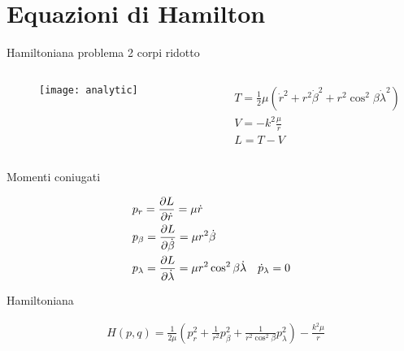 \section{Equazioni di Hamilton}

\begin{frame}{Hamiltoniana problema 2 corpi ridotto}

\begin{columns}

\begin{column}{0.2\textwidth}

\begin{figure}[!ht]

\texttt{[image: analytic]}

\end{figure}


\end{column}

\begin{column}{0.8\textwidth}

\begin{align*}
&T=\frac{1}{2}\mu(\dot{r}^2+r^2\dot{\beta}^2+r^2\cos^2{\beta}\dot{\lambda}^2)\\
&V=-k^2\frac{\mu}{r}\\
&L=T-V
\end{align*}

\end{column}

\end{columns}

\begin{block}{Momenti coniugati}

\begin{align*}
&p_r=\PDy{\dot{r}}{L}=\mu\dot{r}\\
&p_{\beta}=\PDy{\dot{\beta}}{L}=\mu r^2\dot{\beta}\\
&p_{\lambda}=\PDy{\dot{\lambda}}{L}=\mu r^2\cos^2{\beta}\dot{\lambda}\quad \dot{p}_{\lambda}=0
\end{align*}

\end{block}

\begin{block}{Hamiltoniana}

\begin{align*}
&H(p,q)=\frac{1}{2\mu}(p_r^2+\frac{1}{r^2}p_{\beta}^2+\frac{1}{r^2\cos^2{\beta}}p_{\lambda}^2)-\frac{k^2\mu}{r}
\end{align*}


\end{block}

\end{frame}

